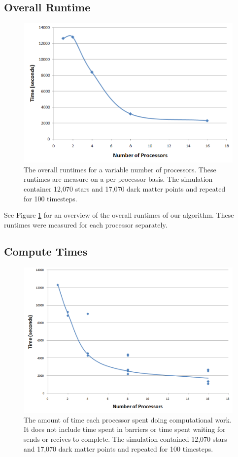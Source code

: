 \documentclass{article}
\begin{document}
\subsection{Overall Runtime}

\begin{figure}
\centering
\includegraphics[width=\columnwidth]{overall-runtimes.png}
\caption{The overall runtimes for a variable number of processors.  These runtimes are measure on a per processor basis.  The simulation container 12,070 stars and 17,070 dark matter points and repeated for 100 timesteps. \label{fig:overall-runtimes}}
\end{figure} 

See Figure \ref{fig:overall-runtimes} for an overview of the overall runtimes of our algorithm.  These runtimes were measured for each processor separately.

\subsection{Compute Times}

\begin{figure}
\centering
\includegraphics[width=\columnwidth]{compute-runtimes.png}
\caption{The amount of time each processor spent doing computational work.  It does not include time spent in barriers or time spent waiting for sends or recives to complete. The simulation contained 12,070 stars and 17,070 dark matter points and repeated for 100 timesteps. \label{fig:compute-runtimes}}
\end{figure} 
\end{document}
